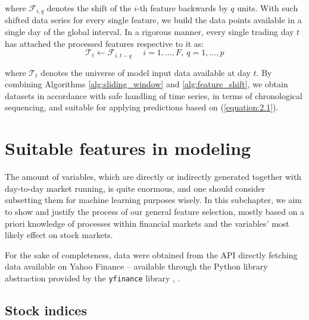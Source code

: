 where $\mathcal{F}_{i,q}$ denotes the shift of the $i$-th feature backwards
by $q$ units. With such shifted data series for every single feature, we build the data points available in a single day of the global interval. In a rigorous manner, every single trading day $t$
has attached the processed features respective to it as:
\begin{equation*}
    \mathcal{T}_t \gets \mathcal{F}_{i,t-q} \>\>\>\>\>\>{i=1, ..., F, \> q = 1, ..., p}
\end{equation*}

where $\mathcal{T}_t$ denotes the universe of model input data available at day $t$. By combining Algorithms \ref{alg:sliding_window} and \ref{alg:feature_shift}, we obtain datasets in accordance with safe handling of time series,
in terms of chronological sequencing, and suitable for applying predictions based on (\ref{equation:2.1}).

\section{Suitable features in modeling}

The amount of variables, which are directly or indirectly generated together with 
day-to-day market running, is quite enormous, and one should consider subsetting them 
for machine learning purposes wisely. In this subchapter, we aim to show and justify the 
process of our general feature selection, mostly based on a priori knowledge of processes within
financial markets and the variables' most likely effect on stock markets.
\par
For the sake of completeness, data were obtained from the API directly fetching data
available on Yahoo Finance – available through the Python library abstraction provided by the \texttt{yfinance} library \cite{yfinance}, \cite{yahoo}.

\subsection{Stock indices}

